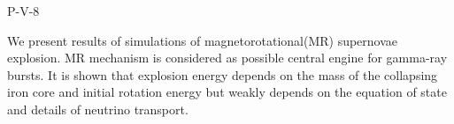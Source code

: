 P-V-8


\bigskip



\bigskip

\noindent We present results of simulations of magnetorotational(MR) supernovae explosion. MR mechanism is considered as possible central engine for gamma-ray bursts. It is shown that explosion energy depends on the mass of the collapsing iron core and initial rotation energy but weakly depends on the equation of state and details of neutrino transport.

